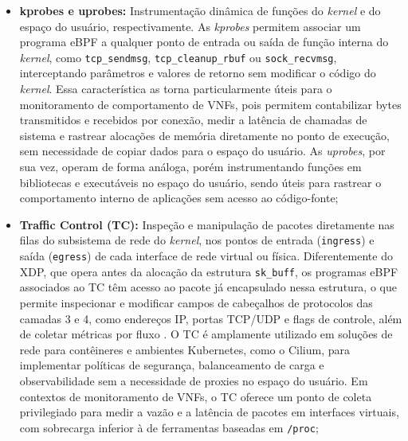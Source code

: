 \begin{itemize}
    \item \textbf{kprobes e uprobes:} Instrumentação dinâmica de funções do \textit{kernel} e do espaço do usuário, respectivamente. As \textit{kprobes} permitem associar um programa eBPF a qualquer ponto de entrada ou saída de função interna do \textit{kernel}, como \texttt{tcp\_sendmsg}, \texttt{tcp\_cleanup\_rbuf} ou \texttt{sock\_recvmsg}, interceptando parâmetros e valores de retorno sem modificar o código do \textit{kernel}. Essa característica as torna particularmente úteis para o monitoramento de comportamento de VNFs, pois permitem contabilizar bytes transmitidos e recebidos por conexão, medir a latência de chamadas de sistema e rastrear alocações de memória diretamente no ponto de execução, sem necessidade de copiar dados para o espaço do usuário. As \textit{uprobes}, por sua vez, operam de forma análoga, porém instrumentando funções em bibliotecas e executáveis no espaço do usuário, sendo úteis para rastrear o comportamento interno de aplicações sem acesso ao código-fonte;

    \item \textbf{Traffic Control (TC):} Inspeção e manipulação de pacotes diretamente nas filas do subsistema de rede do \textit{kernel}, nos pontos de entrada (\texttt{ingress}) e saída (\texttt{egress}) de cada interface de rede virtual ou física. Diferentemente do XDP, que opera antes da alocação da estrutura \texttt{sk\_buff}, os programas eBPF associados ao TC têm acesso ao pacote já encapsulado nessa estrutura, o que permite inspecionar e modificar campos de cabeçalhos de protocolos das camadas 3 e 4, como endereços IP, portas TCP/UDP e flags de controle, além de coletar métricas por fluxo \cite{10.1145/3594255.3594256}. O TC é amplamente utilizado em soluções de rede para contêineres e ambientes Kubernetes, como o Cilium, para implementar políticas de segurança, balanceamento de carga e observabilidade sem a necessidade de proxies no espaço do usuário. Em contextos de monitoramento de VNFs, o TC oferece um ponto de coleta privilegiado para medir a vazão e a latência de pacotes em interfaces virtuais, com sobrecarga inferior à de ferramentas baseadas em \texttt{/proc};


\end{itemize}
